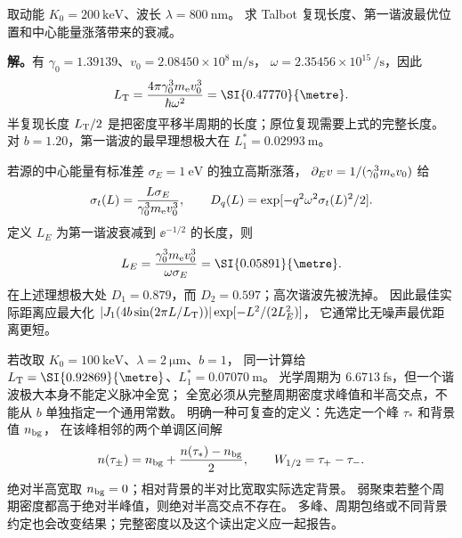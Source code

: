 \begin{exbox}[相对论漂移长度与有限能散的数值核对]
取动能 $K_0=\SI{200}{\kilo\electronvolt}$、波长 $\lambda=\SI{800}{\nano\metre}$。
求 Talbot 复现长度、第一谐波最优位置和中心能量涨落带来的衰减。

\textbf{解。}有 $\gamma_0=1.39139$、$v_0=2.08450\times10^8\,\si{\metre\per\second}$，
$\omega=2.35456\times10^{15}\,\si{\per\second}$，因此
\begin{equation}
L_{\rm T}=\frac{4\pi\gamma_0^3m_{\rm e}v_0^3}{\hbar\omega^2}
=\SI{0.47770}{\metre}.
\label{eq:feqo-talbot-numerical}
\end{equation}
半复现长度 $L_{\rm T}/2$ 是把密度平移半周期的长度；原位复现需要上式的完整长度。
对 $b=1.20$，第一谐波的最早理想极大在 $L_1^*=\SI{0.02993}{\metre}$。

若源的中心能量有标准差 $\sigma_E=\SI{1}{\electronvolt}$ 的独立高斯涨落，
$\partial_Ev=1/(\gamma_0^3m_{\rm e}v_0)$ 给
\[
\sigma_t(L)=\frac{L\sigma_E}{\gamma_0^3m_{\rm e}v_0^3},\qquad
D_q(L)=\exp[-q^2\omega^2\sigma_t(L)^2/2].
\]
定义 $L_E$ 为第一谐波衰减到 $\ee^{-1/2}$ 的长度，则
\begin{equation}
L_E=\frac{\gamma_0^3m_{\rm e}v_0^3}{\omega\sigma_E}
=\SI{0.05891}{\metre}.
\label{eq:feqo-LE-def}
\end{equation}
在上述理想极大处 $D_1=0.879$，而 $D_2=0.597$；高次谐波先被洗掉。
因此最佳实际距离应最大化
$|J_1(4b\sin(2\pi L/L_{\rm T}))|\exp[-L^2/(2L_E^2)]$，
它通常比无噪声最优距离更短。

若改取 $K_0=\SI{100}{\kilo\electronvolt}$、$\lambda=\SI{2}{\micro\metre}$、$b=1$，
同一计算给 $L_{\rm T}=\SI{0.92869}{\metre}$、$L_1^*=\SI{0.07070}{\metre}$。
光学周期为 $\SI{6.6713}{\femto\second}$，但一个谐波极大本身不能定义脉冲全宽；
全宽必须从完整周期密度求峰值和半高交点，不能从 $b$ 单独指定一个通用常数。
明确一种可复查的定义：先选定一个峰 $\tau_*$ 和背景值 $n_{\rm bg}$，
在该峰相邻的两个单调区间解
\begin{equation}
 n(\tau_\pm)=n_{\rm bg}+\frac{n(\tau_*)-n_{\rm bg}}2,\qquad
 W_{1/2}=\tau_+-\tau_-.
 \label{eq:feqo-pulse-width-definition}
\end{equation}
绝对半高宽取 $n_{\rm bg}=0$；相对背景的半对比宽取实际选定背景。
弱聚束若整个周期密度都高于绝对半峰值，则绝对半高交点不存在。
多峰、周期包络或不同背景约定也会改变结果；完整密度以及这个读出定义应一起报告。
\end{exbox}
